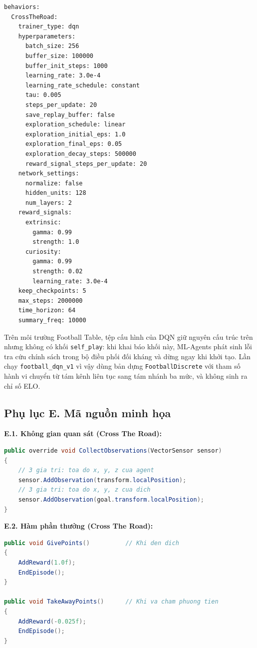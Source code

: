 \begin{lstlisting}[basicstyle=\ttfamily\scriptsize,caption={ctr\_dqn.yaml},captionpos=b]
behaviors:
  CrossTheRoad:
    trainer_type: dqn
    hyperparameters:
      batch_size: 256
      buffer_size: 100000
      buffer_init_steps: 1000
      learning_rate: 3.0e-4
      learning_rate_schedule: constant
      tau: 0.005
      steps_per_update: 20
      save_replay_buffer: false
      exploration_schedule: linear
      exploration_initial_eps: 1.0
      exploration_final_eps: 0.05
      exploration_decay_steps: 500000
      reward_signal_steps_per_update: 20
    network_settings:
      normalize: false
      hidden_units: 128
      num_layers: 2
    reward_signals:
      extrinsic:
        gamma: 0.99
        strength: 1.0
      curiosity:
        gamma: 0.99
        strength: 0.02
        learning_rate: 3.0e-4
    keep_checkpoints: 5
    max_steps: 2000000
    time_horizon: 64
    summary_freq: 10000
\end{lstlisting}

Trên môi trường Football Table, tệp cấu hình của DQN giữ nguyên cấu trúc trên nhưng
không có khối \texttt{self\_play}: khi khai báo khối này, ML-Agents phát sinh
lỗi tra cứu chính sách trong bộ điều phối đối kháng và dừng ngay khi khởi tạo. Lần chạy
\texttt{football\_dqn\_v1} vì vậy dùng bản dựng \texttt{FootballDiscrete} với tham số
hành vi chuyển từ tám kênh liên tục sang tám nhánh ba mức, và không sinh ra chỉ số ELO.

\subsection*{Phụ lục E. Mã nguồn minh họa}

\noindent\textbf{E.1. Không gian quan sát (Cross The Road):}
\begin{lstlisting}[language=Java,caption={CollectObservations - CrossTheRoadAgent.cs},captionpos=b]
public override void CollectObservations(VectorSensor sensor)
{
    // 3 gia tri: toa do x, y, z cua agent
    sensor.AddObservation(transform.localPosition);
    // 3 gia tri: toa do x, y, z cua dich
    sensor.AddObservation(goal.transform.localPosition);
}
\end{lstlisting}

\noindent\textbf{E.2. Hàm phần thưởng (Cross The Road):}
\begin{lstlisting}[language=Java,caption={GivePoints / TakeAwayPoints - CrossTheRoadAgent.cs},captionpos=b]
public void GivePoints()          // Khi den dich
{
    AddReward(1.0f);
    EndEpisode();
}

public void TakeAwayPoints()      // Khi va cham phuong tien
{
    AddReward(-0.025f);
    EndEpisode();
}
\end{lstlisting}


